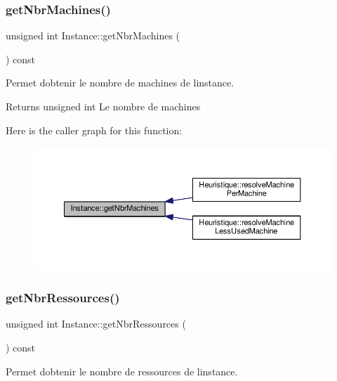 \subsubsection{\texorpdfstring{get\+Nbr\+Machines()}{getNbrMachines()}}
{\footnotesize\ttfamily unsigned int Instance\+::get\+Nbr\+Machines (\begin{DoxyParamCaption}{ }\end{DoxyParamCaption}) const}



Permet d\textquotesingle{}obtenir le nombre de machines de l\textquotesingle{}instance. 

\begin{DoxyReturn}{Returns}
unsigned int Le nombre de machines 
\end{DoxyReturn}
Here is the caller graph for this function\+:\nopagebreak
\begin{figure}[H]
\begin{center}
\leavevmode
\includegraphics[width=350pt]{classInstance_a2f985b9a7ce18fd8739ec589d9016003_icgraph}
\end{center}
\end{figure}
\mbox{\label{classInstance_a79b49dcc3d590b823e41d8a223ecf25d}} 
\subsubsection{\texorpdfstring{get\+Nbr\+Ressources()}{getNbrRessources()}}
{\footnotesize\ttfamily unsigned int Instance\+::get\+Nbr\+Ressources (\begin{DoxyParamCaption}{ }\end{DoxyParamCaption}) const}



Permet d\textquotesingle{}obtenir le nombre de ressources de l\textquotesingle{}instance. 


